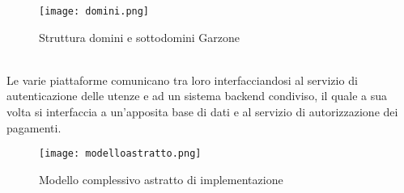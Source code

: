 \begin{figure}[!htb]
    \centering
    \texttt{[image: domini.png]}
    \caption{Struttura domini e sottodomini Garzone}
\end{figure}
\\
Le varie piattaforme comunicano tra loro interfacciandosi al servizio di autenticazione delle utenze e ad un sistema backend condiviso, il quale a sua volta si interfaccia a un'apposita base di dati e al servizio di autorizzazione dei pagamenti.
\begin{figure}[!htb]
    \centering
    \texttt{[image: modelloastratto.png]}
    \caption{Modello complessivo astratto di implementazione}
\end{figure}
\\